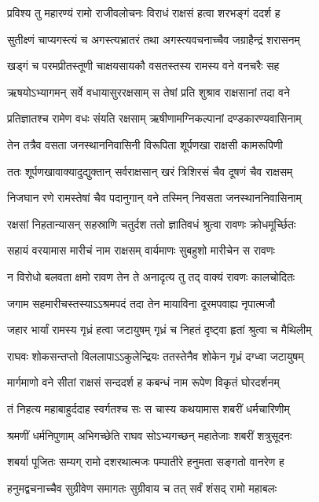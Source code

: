 \twolineshloka
{प्रविश्य तु महारण्यं रामो राजीवलोचनः}
{विराधं राक्षसं हत्वा शरभङ्गं ददर्श ह}%

\twolineshloka
{सुतीक्ष्णं चाप्यगस्त्यं च अगस्त्यभ्रातरं तथा}
{अगस्त्यवचनाच्चैव जग्राहैन्द्रं शरासनम्}%

\twolineshloka
{खड्गं च परमप्रीतस्तूणी चाक्षयसायकौ}
{वसतस्तस्य रामस्य वने वनचरैः सह}%

\twolineshloka
{ऋषयोऽभ्यागमन् सर्वे वधायासुररक्षसाम्}
{स तेषां प्रति शुश्राव राक्षसानां तदा वने}%

\twolineshloka
{प्रतिज्ञातश्च रामेण वधः संयति रक्षसाम्}
{ऋषीणामग्निकल्पानां दण्डकारण्यवासिनाम्}%

\twolineshloka
{तेन तत्रैव वसता जनस्थाननिवासिनी}
{विरूपिता शूर्पणखा राक्षसी कामरूपिणी}%

\twolineshloka
{ततः शूर्पणखावाक्यादुद्युक्तान् सर्वराक्षसान्}
{खरं त्रिशिरसं चैव दूषणं चैव राक्षसम्}%

\twolineshloka
{निजघान रणे रामस्तेषां चैव पदानुगान्}
{वने तस्मिन् निवसता जनस्थाननिवासिनाम्}%

\twolineshloka
{रक्षसां निहतान्यासन् सहस्राणि चतुर्दश}
{ततो ज्ञातिवधं श्रुत्वा रावणः क्रोधमूर्च्छितः}%

\twolineshloka
{सहायं वरयामास मारीचं नाम राक्षसम्}
{वार्यमाणः सुबहुशो मारीचेन स रावणः}%

\twolineshloka
{न विरोधो बलवता क्षमो रावण तेन ते}
{अनादृत्य तु तद् वाक्यं रावणः कालचोदितः}%

\twolineshloka
{जगाम सहमारीचस्तस्याऽऽश्रमपदं तदा}
{तेन मायाविना दूरमपवाह्य नृपात्मजौ}%

\twolineshloka
{जहार भार्यां रामस्य गृध्रं हत्वा जटायुषम्}
{गृध्रं च निहतं दृष्ट्वा हृतां श्रुत्वा च मैथिलीम्}%

\twolineshloka
{राघवः शोकसन्तप्तो विललापाऽऽकुलेन्द्रियः}
{ततस्तेनैव शोकेन गृध्रं दग्ध्वा जटायुषम्}%

\twolineshloka
{मार्गमाणो वने सीतां राक्षसं सन्ददर्श ह}
{कबन्धं नाम रूपेण विकृतं घोरदर्शनम्}%

\twolineshloka
{तं निहत्य महाबाहुर्ददाह स्वर्गतश्च सः}
{स चास्य कथयामास शबरीं धर्मचारिणीम्}%

\twolineshloka
{श्रमणीं धर्मनिपुणाम् अभिगच्छेति राघव}
{सोऽभ्यगच्छन् महातेजाः शबरीं शत्रुसूदनः}%

\twolineshloka
{शबर्या पूजितः सम्यग् रामो दशरथात्मजः}
{पम्पातीरे हनुमता सङ्गतो वानरेण ह}%

\twolineshloka
{हनुमद्वचनाच्चैव सुग्रीवेण समागतः}
{सुग्रीवाय च तत् सर्वं शंसद् रामो महाबलः}%

